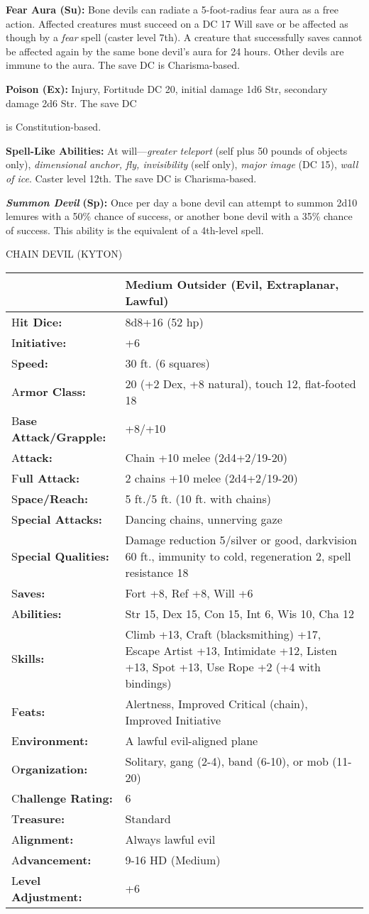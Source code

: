 \documentclass{article}
\begin{document}
\textbf{Fear Aura (Su):} Bone devils can radiate a 5-foot-radius fear aura as a 
free action. Affected creatures must succeed on a DC 17 Will save or be affected 
as though by a \textit{fear }spell (caster level 7th). A creature that successfully 
saves cannot be affected again by the same bone devil's aura for 24 hours. Other 
devils are immune to the aura. The save DC is Charisma-based.

\textbf{Poison (Ex):} Injury, Fortitude DC 20, initial damage 1d6 Str, secondary 
damage 2d6 Str. The save DC

is Constitution-based.

\textbf{Spell-Like Abilities:} At will---\textit{greater teleport }(self plus 50 
pounds of objects only), \textit{dimensional anchor, fly, invisibility }(self only), 
\textit{major image }(DC 15), \textit{wall of ice}. Caster level 12th. The save 
DC is Charisma-based.

\textit{\textbf{Summon Devil }}\textbf{(Sp): }Once per day a bone devil can attempt 
to summon 2d10 lemures with a 50\% chance of success, or another bone devil with 
a 35\% chance of success. This ability is the equivalent of a 4th-level spell.

\vspace{12pt}
CHAIN DEVIL (KYTON)

\begin{tabular}{|>{\raggedright}p{91pt}|>{\raggedright}p{195pt}|}
\hline
  & Medium Outsider (Evil, Extraplanar, Lawful)\tabularnewline
\hline
H\textbf{it Dice:} & 8d8+16 (52 hp)\tabularnewline
\hline
I\textbf{nitiative:} & +6\tabularnewline
\hline
S\textbf{peed:} & 30 ft. (6 squares)\tabularnewline
\hline
A\textbf{rmor Class:} & 20 (+2 Dex, +8 natural), touch 12, flat-footed 18\tabularnewline
\hline
B\textbf{ase Attack/Grapple:} & +8/+10\tabularnewline
\hline
A\textbf{ttack:} & Chain +10 melee (2d4+2/19-20)\tabularnewline
\hline
F\textbf{ull Attack:} & 2 chains +10 melee (2d4+2/19-20)\tabularnewline
\hline
S\textbf{pace/Reach:} & 5 ft./5 ft. (10 ft. with chains)\tabularnewline
\hline
S\textbf{pecial Attacks:} & Dancing chains, unnerving gaze\tabularnewline
\hline
S\textbf{pecial Qualities:} & Damage reduction 5/silver or good, darkvision 60 
ft., immunity to cold, regeneration 2, spell resistance 18\tabularnewline
\hline
S\textbf{aves:} & Fort +8, Ref +8, Will +6\tabularnewline
\hline
A\textbf{bilities:} & Str 15, Dex 15, Con 15, Int 6, Wis 10, Cha 12\tabularnewline
\hline
S\textbf{kills:} & Climb +13, Craft (blacksmithing) +17, Escape Artist +13, Intimidate 
+12, Listen +13, Spot +13, Use Rope +2 (+4 with bindings)\tabularnewline
\hline
F\textbf{eats:} & Alertness, Improved Critical (chain), Improved Initiative\tabularnewline
\hline
E\textbf{nvironment:} & A lawful evil-aligned plane\tabularnewline
\hline
O\textbf{rganization:} & Solitary, gang (2-4), band (6-10), or mob (11-20)\tabularnewline
\hline
C\textbf{hallenge Rating:} & 6\tabularnewline
\hline
T\textbf{reasure:} & Standard\tabularnewline
\hline
A\textbf{lignment:} & Always lawful evil\tabularnewline
\hline
A\textbf{dvancement:} & 9-16 HD (Medium)\tabularnewline
\hline
L\textbf{evel Adjustment:} & +6\tabularnewline
\hline
\end{tabular}
\end{document}
